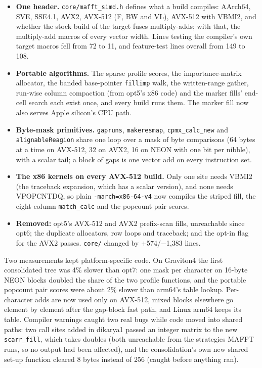 \documentclass[11pt]{article}
\newcommand{\code}[1]{\texttt{#1}}
\begin{document}
\begin{itemize}
\item \textbf{One header.} \code{core/mafft\_simd.h} defines what a build compiles: AArch64,
  SVE, SSE4.1, AVX2, AVX-512 (F, BW and VL), AVX-512 with VBMI2, and whether the stock build of
  the target fuses multiply-adds; with that, the multiply-add macros of every vector width. Lines
  testing the compiler's own target macros fell from 72 to 11, and feature-test lines overall
  from 149 to 108.
\item \textbf{Portable algorithms.} The sparse profile scores, the importance-matrix allocator,
  the banded base-pointer \code{fillimp} walk, the written-range gather, run-wise column
  compaction (from opt5's x86 code) and the marker fills' end-cell search each exist once, and every build
  runs them. The marker fill now also serves Apple silicon's CPU path.
\item \textbf{Byte-mask primitives.} \code{gapruns}, \code{makeresmap}, \code{cpmx\_calc\_new}
  and \code{alignableReagion} share one loop over a mask of byte comparisons (64 bytes at a time
  on AVX-512, 32 on AVX2, 16 on NEON with one bit per nibble), with a scalar tail; a block of
  gaps is one vector add on every instruction set.
\item \textbf{The x86 kernels on every AVX-512 build.} Only one site needs VBMI2 (the traceback
  expansion, which has a scalar version), and none needs VPOPCNTDQ, so plain
  \code{-march=x86-64-v4} now compiles the striped fill, the eight-column \code{match\_calc} and
  the popcount pair scores.
\item \textbf{Removed:} opt5's AVX-512 and AVX2 prefix-scan fills, unreachable since opt6; the
  duplicate allocators, row loops and traceback; and the opt-in flag for the AVX2 passes.
  \code{core/} changed by $+$574/$-$1{,}383 lines.
\end{itemize}

Two measurements kept platform-specific code. On Graviton4 the first consolidated tree was
4\% slower than opt7: one mask per character on 16-byte NEON blocks doubled the share of the
two profile functions, and the portable popcount pair scores were about 2\% slower than arm64's
table lookup. Per-character adds are now used only on AVX-512, mixed blocks elsewhere go
element by element after the gap-block fast path, and Linux arm64 keeps its table. Compiler
warnings caught two real bugs while code moved into shared paths: two call sites added in
dikarya1 passed an integer matrix to the new \code{scarr\_fill}, which takes doubles (both
unreachable from the strategies MAFFT runs, so no output had been affected), and the
consolidation's own new shared set-up function cleared 8 bytes instead of 256 (caught before
anything ran).
\end{document}
